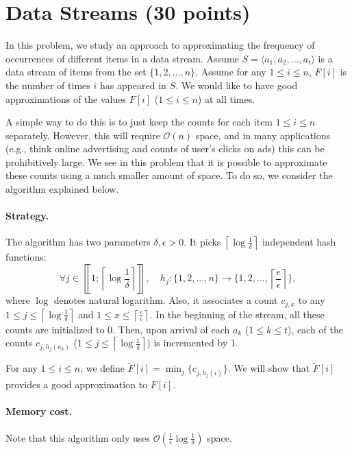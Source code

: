 \section{Data Streams (30 points)}

In this problem, we study an approach to approximating the frequency of occurrences of different items in a data stream. Assume $S = \langle a_1, a_2, \ldots, a_t \rangle$ is a data stream of items from the set $\{1, 2, \ldots, n\}$. Assume for any $1\leq i\leq n$, $F[i]$ is the number of times $i$ has appeared in $S$. We would like to have good approximations of the values $F[i]$ ($1\leq i\leq n$) at all times.

A simple way to do this is to just keep the counts for each item $1\leq i\leq n$ separately. However, this will require $\mathcal{O}(n)$ space, and in many applications (e.g., think online advertising and counts of user's clicks on ads) this can be prohibitively large. We see in this problem that it is possible to approximate these counts using a much smaller amount of space. To do so, we consider the algorithm explained below.

\paragraph{Strategy.} The algorithm has two parameters $\delta, \epsilon >0$. It picks $\left\lceil \log\frac{1}{\delta}\right\rceil$ independent hash functions:
\[
\forall j \in \left\llbracket 1; \left\lceil \log\frac{1}{\delta}\right\rceil\right\rrbracket, \quad h_j:\{1,2,\ldots, n\} \rightarrow \{1,2, \ldots, \left\lceil \frac{e}{\epsilon} \right\rceil\},
\]
where $\log$ denotes natural logarithm. Also, it associates a count $c_{j,x}$ to any $1\leq j\leq  \left\lceil \log\frac{1}{\delta}\right\rceil$ and $1\leq x \leq  \left\lceil \frac{e}{\epsilon} \right\rceil$. In the beginning of the stream, all these counts are initialized to $0$. Then, upon arrival of each $a_k$ ($1\leq k \leq t$), each of the counts $c_{j, h_j(a_k)}$ ($1\leq j\leq \left\lceil \log\frac{1}{\delta}\right\rceil$) is incremented by $1$. 

For any $1\leq i\leq n$, we define $\tilde{F}[i] = \min_{j} \{c_{j,h_j(i)}\}$. We will show that $\tilde{F}[i]$ provides a good approximation to $F[i]$. 

\paragraph{Memory cost.} Note that this algorithm only uses $\mathcal{O}\left(\frac{1}{\epsilon}\log\frac{1}{\delta}\right)$ space.

